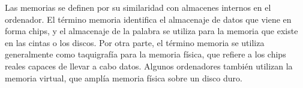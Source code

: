 \documentclass{article}
\begin{document}
Las memorias se definen por su similaridad con almacenes internos en el ordenador. El término memoria identifica el almacenaje de datos que viene en forma chips, y el almacenaje de la palabra se utiliza para la memoria que existe en las cintas o los discos. Por otra parte, el término memoria se utiliza generalmente como taquigrafía para la memoria física, que refiere a los chips reales capaces de llevar a cabo datos. Algunos ordenadores también utilizan la memoria virtual, que amplía memoria física sobre un disco duro.\cite{monografia.com}
\begin{lstlisting}
\end{lstlisting}




\end{document}
